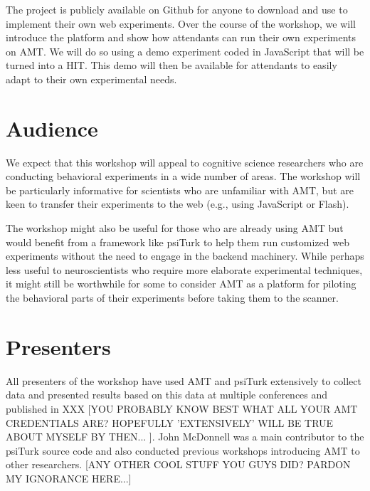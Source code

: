 \documentclass[10pt,letterpaper]{article}
\begin{document}
The project is publicly available on Github for anyone to download and use to implement their own web experiments.
Over the course of the workshop, we will introduce the platform and show how attendants can run their own experiments on AMT.
We will do so using a demo experiment coded in JavaScript that will be turned into a HIT.
This demo will then be available for attendants to easily adapt to their own experimental needs.


\section{Audience}
We expect that this workshop will appeal to cognitive science researchers who are conducting behavioral experiments in a wide number of areas.
The workshop will be particularly informative for scientists who are unfamiliar with AMT, but are keen to transfer their experiments to the web (e.g., using JavaScript or Flash).

The workshop might also be useful for those who are already using AMT but would benefit from a framework like psiTurk to help them run customized web experiments without the need to engage in the backend machinery.
While perhaps less useful to neuroscientists who require more elaborate experimental techniques, it might still be worthwhile for some to consider AMT as a platform for piloting the behavioral parts of their experiments before taking them to the scanner.


\section{Presenters}

All presenters of the workshop have used AMT and psiTurk extensively to collect data and presented results based on this data at multiple conferences and published in XXX  [YOU PROBABLY KNOW BEST WHAT ALL YOUR AMT CREDENTIALS ARE? HOPEFULLY 'EXTENSIVELY' WILL BE TRUE ABOUT MYSELF BY THEN... ].
John McDonnell was a main contributor to the psiTurk source code and also conducted previous workshops introducing AMT to other researchers.
[ANY OTHER COOL STUFF YOU GUYS DID? PARDON MY IGNORANCE HERE...]




\setlength{\bibleftmargin}{.125in}
\setlength{\bibindent}{-\bibleftmargin}



\todos
\end{document}
